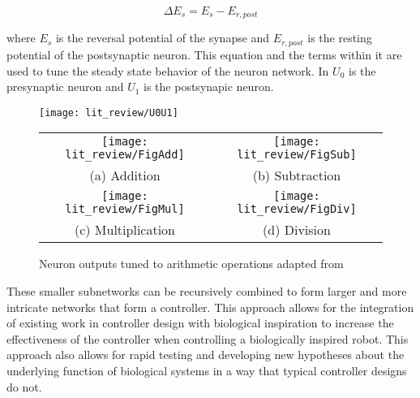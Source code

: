 \begin{equation}
\Delta E_{s} = E_{s} - E_{r, post}
\end{equation}

where $E_{s}$ is the reversal potential of the synapse and $E_{r, post}$ is the resting potential of the postsynaptic neuron.
This equation and the terms within it are used to tune the steady state behavior of the neuron network. In 
$U_{0}$ is the presynaptic neuron and $U_{1}$ is the postsynapic neuron.

\begin{figure}
\centering

\texttt{[image: lit\_review/U0U1]}

\begin{tabular}{cc}
\texttt{[image: lit\_review/FigAdd]} &
\texttt{[image: lit\_review/FigSub]} \\
(a) Addition & (b) Subtraction \\
\texttt{[image: lit\_review/FigMul]} &
\texttt{[image: lit\_review/FigDiv]} \\
(c) Multiplication & (d) Division \\
\end{tabular}
\caption{Neuron outputs tuned to arithmetic operations adapted from \cite{NickFunctionalSubnetwork}}
\label{fig:MathOutputs}
\end{figure}

These smaller subnetworks can be recursively combined to form larger and more intricate
networks that form a controller. This approach allows for the integration of
existing work in controller design with biological inspiration to increase the
effectiveness of the controller when controlling a biologically inspired robot.
This approach also allows for rapid testing and developing new hypotheses about the underlying function of biological systems in a way that typical controller designs do not.
